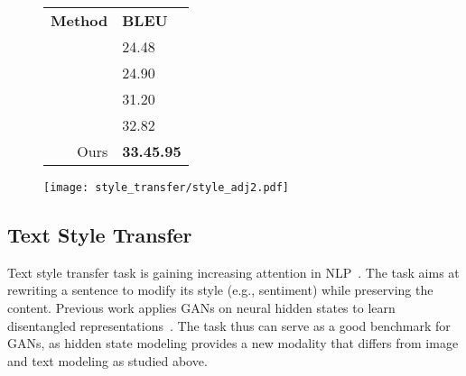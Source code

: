 \documentclass{article}
\newcommand{\0}{\bm{0}}
\begin{document}
\begin{figure*}
\begin{minipage}{0.34\textwidth}
\small
  \centering
  \begin{tabular}{@{}rl@{}}
    \toprule
    {\bf Method} &  {\bf BLEU} \\
    \cmidrule{1-2}
    \citet{zhang2018style} & 24.48 \\
    \citet{tian2018structured} & 24.90 \\
    \citet{subramanian2018multiple} & 31.20 \\
    \citet{tikhonov2019style} & 32.82 \\\cmidrule{1-2}
    Ours & \textbf{33.45.95}\\
    \bottomrule
  \end{tabular}
   \label{tab:styletransfer_tbl2}
\vspace{-20pt}
\end{minipage}
\hfill
\begin{minipage}{0.64\textwidth}
\begin{center}
\centerline{\texttt{[image: style\_transfer/style\_adj2.pdf]}}
\vspace{-10pt}
\label{fig:styletransfer_img}
\end{center}
\end{minipage}
\vspace{-20pt}
\end{figure*}


\subsection{Text Style Transfer}\label{sec:exp:style}
Text style transfer task is gaining increasing attention in NLP~\cite{hu2017toward,shen2017style,yang2018unsupervised}. The task aims at rewriting a sentence to modify its style (e.g., sentiment) while preserving the content. Previous work applies GANs on neural hidden states to learn disentangled representations~\cite{shen2017style,tikhonov2019style}. The task thus can serve as a good benchmark for GANs, as hidden state modeling provides a new modality that differs from image and text modeling as studied above.
\end{document}
